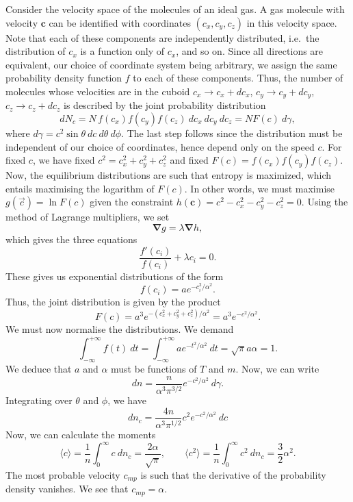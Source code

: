 \documentclass[11pt]{article}
\newcommand\ve[1]{\boldsymbol{#1}}
\newcommand\grad[1]{\ve{\nabla}#1}
\newcommand\E[1]{\langle #1 \rangle}
\theoremstyle{definition}
\theoremstyle{remark}
\numberwithin{equation}{section}
\begin{document}
    Consider the velocity space of the molecules of an ideal gas. A gas molecule
    with velocity $\ve{c}$ can be identified with coordinates $(c_x, c_y, c_z)$ in
    this velocity space. Note that each of these components are independently
    distributed, i.e.\ the distribution of $c_x$ is a function only of $c_x$, and so
    on. Since all directions are equivalent, our choice of coordinate system being
    arbitrary, we assign the same probability density function $f$ to each of these
    components. Thus, the number of molecules whose velocities are in the cuboid
    $c_x \to c_x + dc_x$, $c_y \to c_y + dc_y$, $c_z \to c_z + dc_z$ is described by
    the joint probability distribution \[
        dN_c = N\, f(c_x)f(c_y)f(c_z)\:dc_x\:dc_y\:dc_z = N F(c)\:d\gamma,
    \] where $d\gamma = c^2\sin\theta\:dc\:d\theta\:d\phi$.
    The last step follows since the distribution must be independent of our
    choice of coordinates, hence depend only on the speed $c$. For fixed $c$, we
    have fixed $c^2 = c_x^2 + c_y^2 + c_z^2$ and fixed $F(c) = f(c_x)f(c_y)f(c_z)$.
    Now, the equilibrium distributions are such that entropy is maximized, which
    entails maximising the logarithm of $F(c)$.  In other words, we must maximise
    $g(\vec{c}) = \ln{F(c)}$ given the constraint $h(\ve{c}) = c^2 - c_x^2 - c_y^2 -
    c_z^2 = 0$. Using the method of Lagrange multipliers, we set \[
        \grad{g} = \lambda \grad{h},
    \] which gives the three equations \[
        \frac{f'(c_i)}{f(c_i)} + \lambda c_i = 0.
    \] These gives us exponential distributions of the form \[
        f(c_i) = a e^{-c_i^2 / \alpha^2}.
    \] Thus, the joint distribution is given by the product \[
        F(c) = a^3e^{-(c_x^2 + c_y^2 + c_z^2) /\alpha^2} = a^3e^{-c^2 / \alpha^2}.
    \] We must now normalise the distributions. We demand \[
        \int_{-\infty}^{+\infty} f(t)\:dt = \int_{-\infty}^{+\infty} ae^{-t^2 /
        \alpha^2}\:dt = \sqrt{\pi}a\alpha = 1.
    \] We deduce that $a$ and $\alpha$ must be functions of $T$ and $m$.
    Now, we can write \[
        dn = \frac{n}{\alpha^3\pi^{3 / 2}} e^{-c^2 / \alpha^2} \:d\gamma.
    \] Integrating over $\theta$ and $\phi$, we have \[
        dn_c = \frac{4n}{\alpha^3\pi^{1 /2}} c^2 e^{-c^2 / \alpha^2} \:dc
    \] Now, we can calculate the moments \[
        \E{c} = \frac{1}{n}\int_0^\infty c\:dn_c = \frac{2\alpha}{\sqrt{\pi}}, \qquad
        \E{c^2} = \frac{1}{n}\int_0^\infty c^2\:dn_c = \frac{3}{2}\alpha^2.
    \] The most probable velocity $c_{mp}$ is such that the derivative of the
    probability density vanishes. We see that $c_{mp} = \alpha$.
\end{document}
